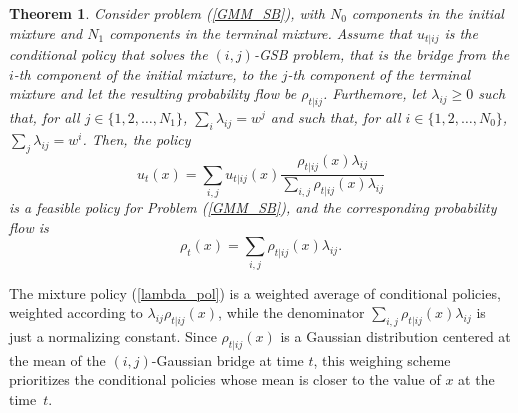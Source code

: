 \documentclass[twoside]{article}
\newtheorem{theorem}{Theorem}
\newtheorem{remark}{Remark}
\renewcommand{\eqref}[1]{(\ref{#1})}
\newcommand{\gmm}{\mathrm{GMM}}
\begin{document}
\begin{theorem} \label{feasibility_thm}
    Consider problem \eqref{GMM_SB}, with $N_0$ components in the initial mixture and $N_1$ components in the terminal mixture. 
    Assume that $u_{t|ij}$ is the conditional policy that solves the $(i,j)$-GSB problem, that is the bridge from the $i$-th component of the initial mixture, to the $j$-th component of the terminal mixture and let the resulting probability flow be $\rho_{t|ij}$. 
    Furthemore,  let $\lambda_{ij} \geq 0$ such that, for all $j\in\{1, 2, \dots, N_1\}$, $\sum_i \lambda_{ij} = w^j$ and such that, for all $i \in\{1, 2, \dots, N_0\}$, $\sum_{j} \lambda_{ij} = w^i$.
    Then, the policy
    \begin{equation}\label{lambda_pol}
        u_t(x) = \sum_{i,j} {u_{t|ij}(x) \frac{ \rho_{t|ij}(x)\lambda_{ij}}{\sum_{i,j} \rho_{t|ij}(x) \lambda_{ij}}}
    \end{equation}
    is a feasible policy for Problem \eqref{GMM_SB}, and
    the corresponding probability flow is
\begin{equation}\label{rho_lambda}
    \rho_t(x) = \sum_{i,j} \rho_{t|ij}(x) \lambda_{ij}.
\end{equation}
\end{theorem}
%
The mixture policy \eqref{lambda_pol} is a weighted average of conditional policies, weighted according to  $\lambda_{ij} \rho_{t|ij}(x)$, while the denominator $\sum_{i,j} \rho_{t|ij}(x) \lambda_{ij}$ is just a normalizing constant.
Since $\rho_{t|ij}(x)$ is a Gaussian distribution centered at the mean of the $(i,j)$-Gaussian bridge at time $t$, this weighing scheme prioritizes the conditional policies whose mean is closer to the value of $x$ at the time~$t$.

\end{document}
